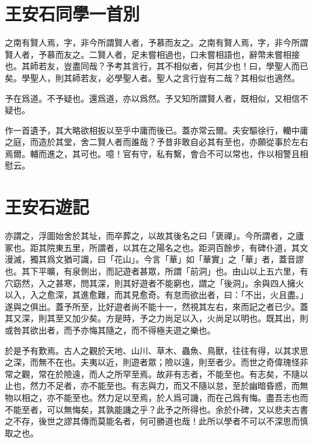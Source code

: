 \theendnotes

\section[同學一首別子固\quad{\small 王安石}]{{\normalsize 王安石}\quad 同學一首別}
之南有賢人焉，字，非今所謂賢人者，予慕而友之。之南有賢人焉，字，非今所謂賢人者，予慕而友之。二賢人者，足未嘗相過也，口未嘗相語也，辭幣未嘗相接也。其師若友，豈盡同哉？予考其言行，其不相似者，何其少也！曰，學聖人而已矣。學聖人，則其師若友，必學聖人者。聖人之言行豈有二哉？其相似也適然。

予在爲道。不予疑也。還爲道，亦以爲然。予又知所謂賢人者，既相似，又相信不疑也。

作一首遺予，其大略欲相扳以至乎中庸而後已。蓋亦常云爾。夫安驅徐行，轥中庸之庭，而造於其{堂}，舍二賢人者而誰哉？予昔非敢自必其有至也，亦願從事於左右焉爾。輔而進之，其可也。噫！官有守，私有繫，會合不可以常也，作以相警且相慰云。%

\theendnotes

\section[遊褒禪山記\quad{\small 王安石}]{{\normalsize 王安石}\quad 遊記}
亦謂之，浮圖始舍於其址，而卒葬之，以故其後名之曰「褒禪」。今所謂者，之廬冢也。距其院東五里，所謂者，以其在之陽名之也。距洞百餘步，有碑仆道，其文漫滅，獨其爲文猶可識，曰「花山」。今言「華」如「華實」之「華」者，蓋音謬也。其下平曠，有泉側出，而記遊者甚眾，所謂「前洞」也。由山以上五六里，有穴窈然，入之甚寒，問其深，則其好遊者不能窮也，謂之「後洞」。余與四人擁火以入，入之愈深，其進愈難，而其見愈奇。有怠而欲出者，曰：「不出，火且盡。」遂與之俱出。蓋予所至，比好遊者尚不能十一，然視其左右，來而記之者已少。蓋其又深，則其至又加少矣。方是時，予之力尚足以入，火尚足以明也。既其出，則或咎其欲出者，而予亦悔其隨之，而不得極夫遊之樂也。

於是予有歎焉。古人之觀於天地、山川、草木、蟲魚、鳥獸，往往有得，以其求思之深，而無不在也。夫夷以近，則遊者眾；險以遠，則至者少。而世之奇偉瑰怪非常之觀，常在於險遠，而人之所罕至焉。故非有志者，不能至也。有志矣，不隨以止也，然力不足者，亦不能至也。有志與力，而又不隨以怠，至於幽暗昏惑，而無物以相之，亦不能至也。然力足以至焉，於人爲可譏，而在己爲有悔。盡吾志也而不能至者，可以無悔矣，其孰能譏之乎？此予之所得也。余於仆碑，又以悲夫古書之不存，後世之謬其傳而莫能名者，何可勝道也哉！此所以學者不可以不深思而慎取之也。

